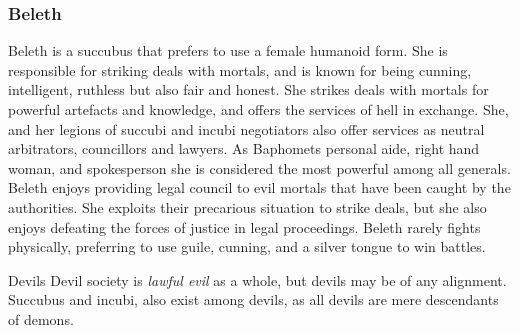 \subsubsection{Beleth}
\label{sec:Beleth}

Beleth is a succubus that prefers to use a female humanoid form. She is 
responsible for striking deals with mortals, and is known for being 
cunning, intelligent, ruthless but also fair and honest. She strikes deals 
with mortals for powerful artefacts and knowledge, and offers the services 
of hell in exchange. She, and her legions of succubi and incubi negotiators 
also offer services as neutral arbitrators, councillors and lawyers. As 
Baphomets personal aide, right hand woman, and spokesperson she is 
considered the most powerful among all generals. Beleth enjoys providing 
legal council to evil mortals that have been caught by the authorities. She 
exploits their precarious situation to strike deals, but she also enjoys 
defeating the forces of justice in legal proceedings. Beleth rarely fights 
physically, preferring to use guile, cunning, and a silver tongue to win 
battles.

\begin{35e}{Devils}
  Devil society is \emph{lawful evil} as a whole, but devils may be of any
  alignment. Succubus and incubi, also exist among devils, as all devils are
  mere descendants of demons.
\end{35e}
